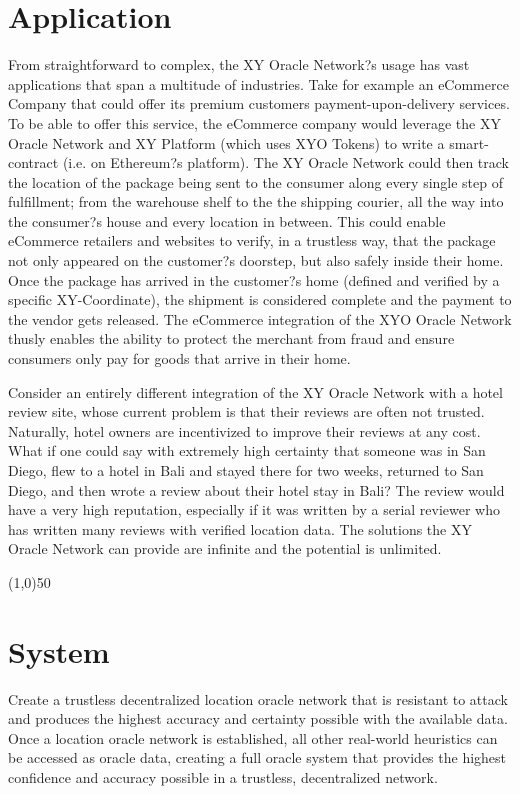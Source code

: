 \documentclass{article}
\begin{document}
\section*{Application}
From straightforward to complex, the XY Oracle Network?s usage  has vast applications that span a multitude of industries. Take for example an eCommerce Company that could offer its premium customers payment-upon-delivery services. To be able to offer this service, the eCommerce company would leverage the XY Oracle Network and XY Platform (which uses XYO Tokens) to write a \gls{smart-contract} (i.e. on Ethereum?s platform). The XY Oracle Network could then track the location of the package being sent to the consumer along every single step of fulfillment; from the warehouse shelf to the the shipping courier, all the way into the consumer?s house and every location in between. This could enable eCommerce retailers and websites to verify, in a trustless way, that the package not only appeared on the customer?s doorstep, but also safely inside their home. Once the package has arrived in the customer?s home (defined and verified by a specific XY-Coordinate), the shipment is considered complete and the payment to the vendor gets released. The eCommerce integration of the XYO Oracle Network thusly enables the ability to protect the merchant from fraud and ensure consumers only pay for goods that arrive in their home.

Consider an entirely different integration of the XY Oracle Network with a hotel review site, whose current problem is that their reviews are often not trusted. Naturally, hotel owners are incentivized to improve their reviews at any cost. What if one could say with extremely high \gls{certainty} that someone was in San Diego, flew to a hotel in Bali and stayed there for two weeks, returned to San Diego, and then wrote a review about their hotel stay in Bali? The review would have a very high reputation, especially if it was written by a serial reviewer who has written many reviews with verified location data. The solutions the XY Oracle Network can provide are infinite and the potential is unlimited.

\begin{center}
\line(1,0){50}
\end{center}

\section {System}
Create a trustless decentralized location \gls{oracle} network that is resistant to attack and produces the highest \gls{accuracy} and \gls{certainty} possible with the available data. Once a location oracle network is established, all other real-world \glspl{heuristic} can be accessed as oracle data, creating a full oracle system that provides the highest confidence and accuracy possible in a trustless, decentralized network.
\end{document}
